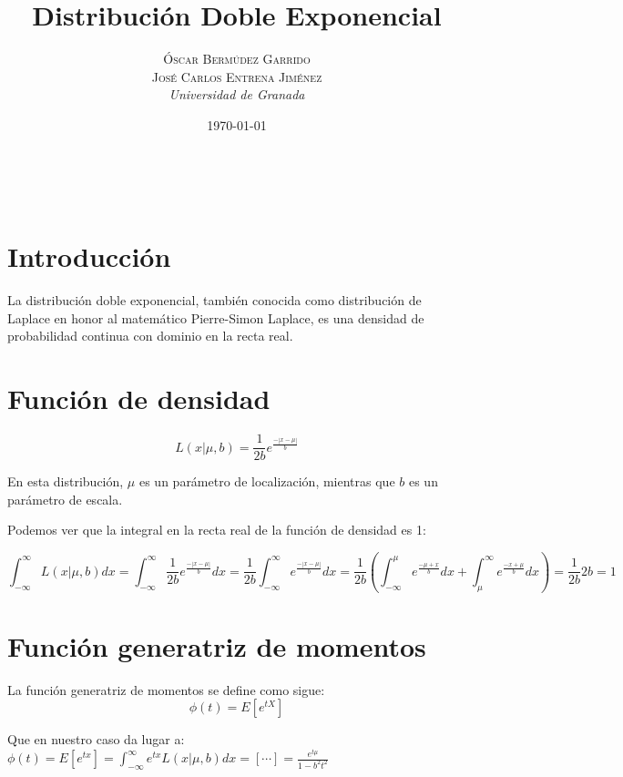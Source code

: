 \documentclass[a4paper, 10pt]{article} %
\title{\textbf{Distribución Doble Exponencial}\\ %
\vspace{20 pt}
} %
\author{\textsc{Óscar Bermúdez Garrido\\José Carlos Entrena Jiménez} %
\\{\textit{Universidad de Granada}}} %
\date{\today} %
\makeatletter
\renewcommand{\maketitle}{ %
\begin{center} %
{\Huge\@title} %
\end{center}

\vspace{20pt} %

\begin{flushright} %
{\large\@author} %
\\\@date %

\vspace{40pt} %
\end{flushright}
\renewcommand{\baselinestretch}{0.5}

}
\newcounter{def}
\makeatother
\begin{document}
\maketitle
\tableofcontents
\setcounter{page}{1}
\pagebreak

\section{Introducción}

La distribución doble exponencial, también conocida como distribución de Laplace en honor al matemático Pierre-Simon Laplace, es una densidad de probabilidad continua con dominio en la recta real. 

\section{Función de densidad}

$$L(x|\mu, b)=\frac{1}{2b}e^\frac{-|x-\mu|}{b}$$

En esta distribución, $\mu$ es un parámetro de localización, mientras que $b$ es un parámetro de escala. 

Podemos ver que la integral en la recta real de la función de densidad es 1: 

$$\int_{-\infty}^{\infty} L(x|\mu, b)dx = \int_{-\infty}^{\infty} \frac{1}{2b}e^\frac{-|x-\mu|}{b}dx =
\frac{1}{2b}\int_{-\infty}^{\infty}e^\frac{-|x-\mu|}{b}dx = 
\frac{1}{2b}\left( \int_{-\infty}^{\mu}e^\frac{-\mu+x}{b}dx + \int_{\mu}^{\infty}e^\frac{-x+\mu}{b}dx \right) =
\frac{1}{2b}2b = 1$$

\section{Función generatriz de momentos}


La función generatriz de momentos se define como sigue:
$$\phi(t)=E[e^{tX}]$$

Que en nuestro caso da lugar a:\\
$\displaystyle \phi(t) = E[e^{tx}] = \int_{-\infty}^{\infty} e^{tx}L(x|\mu, b)dx =
[\cdots] = \frac {e^{t\mu}} {1-b^2t^2}$
\end{document}
